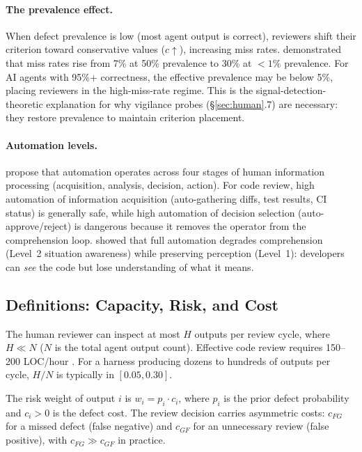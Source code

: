\paragraph{The prevalence effect.} When defect prevalence is low (most agent output is correct), reviewers shift their criterion toward conservative values ($c \uparrow$), increasing miss rates. \citet{wolfe2005low} demonstrated that miss rates rise from 7\% at 50\% prevalence to 30\% at $<1\%$ prevalence. For AI agents with 95\%+ correctness, the effective prevalence may be below 5\%, placing reviewers in the high-miss-rate regime. This is the signal-detection-theoretic explanation for why vigilance probes (\S\ref{sec:human}.7) are necessary: they restore prevalence to maintain criterion placement.

\paragraph{Automation levels.} \citet{parasuraman2000model} propose that automation operates across four stages of human information processing (acquisition, analysis, decision, action). For code review, high automation of information acquisition (auto-gathering diffs, test results, CI status) is generally safe, while high automation of decision selection (auto-approve/reject) is dangerous because it removes the operator from the comprehension loop. \citet{endsley1995outofloop} showed that full automation degrades comprehension (Level~2 situation awareness) while preserving perception (Level~1): developers can \emph{see} the code but lose understanding of what it means.

\subsection{Definitions: Capacity, Risk, and Cost}

\begin{definition}
\label{def:capacity}
The human reviewer can inspect at most $H$ outputs per review cycle, where $H \ll N$ ($N$ is the total agent output count). Effective code review requires 150--200 LOC/hour \citep{fagan1976design, cohen2006best}. For a harness producing dozens to hundreds of outputs per cycle, $H/N$ is typically in $[0.05, 0.30]$.
\end{definition}

\begin{definition}
\label{def:risk-weight}
The risk weight of output $i$ is $w_i = p_i \cdot c_i$, where $p_i$ is the prior defect probability and $c_i > 0$ is the defect cost. The review decision carries asymmetric costs: $c_{FG}$ for a missed defect (false negative) and $c_{GF}$ for an unnecessary review (false positive), with $c_{FG} \gg c_{GF}$ in practice.
\end{definition}

